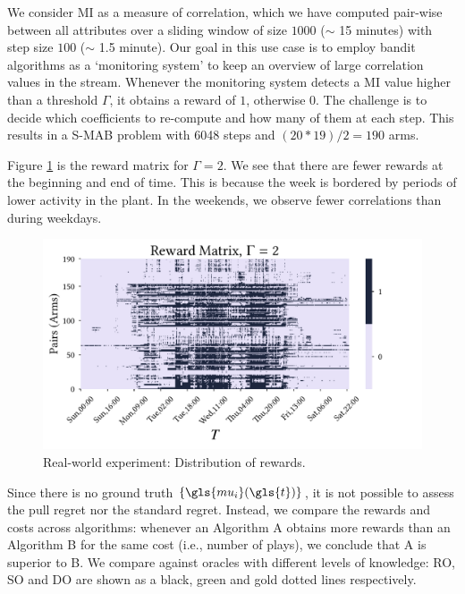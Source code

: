We consider \gls{MI} \cite{kraskov2004estimating} as a measure of correlation, which we have computed pair-wise between all attributes over a sliding window of size $1000$ ($\sim$ 15 minutes) with step size $100$ ($\sim$ 1.5 minute).
Our goal in this use case is to employ bandit algorithms as a `monitoring system' to keep an overview of large correlation values in the stream. Whenever the monitoring system detects a \gls{MI} value higher than a threshold $\Gamma$, it obtains a reward of $1$, otherwise $0$. 
The challenge is to decide which coefficients to re-compute and how many of them at each step. 
This results in a \gls{S-MAB} problem with 6048 steps and $(20*19)/2 = 190$ arms. 

Figure \ref{rewardmatrix} is the reward matrix for $\Gamma = 2$. 
We see that there are fewer rewards at the beginning and end of time.
This is because the week is bordered by periods of lower activity in the plant. In the weekends, we observe fewer correlations than during weekdays. 

\begin{figure}
	\begin{center}
		\includegraphics[width=1.0\linewidth, trim=0cm 0cm 2cm 0cm]{part3-figures/reward_heatmap_bioliq_1wx20_100-2-compressed.pdf}
	\end{center}
	\vspace{-1cm}
	\caption{Real-world experiment: Distribution of rewards.} 
	\label{rewardmatrix}
\end{figure} 

Since there is no ground truth $\{\gls{mu_i}(\gls{t})\}$, it is not possible to assess the pull regret nor the standard regret. 
Instead, we compare the rewards and costs across algorithms: 
whenever an Algorithm A obtains more rewards than an Algorithm B for the same cost (i.e., number of plays), we conclude that A is superior to B.  
We compare against oracles with different levels of knowledge: \gls{RO},  \acrfull{SO} and \gls{DO} are shown as a black, green and gold dotted lines respectively. 

